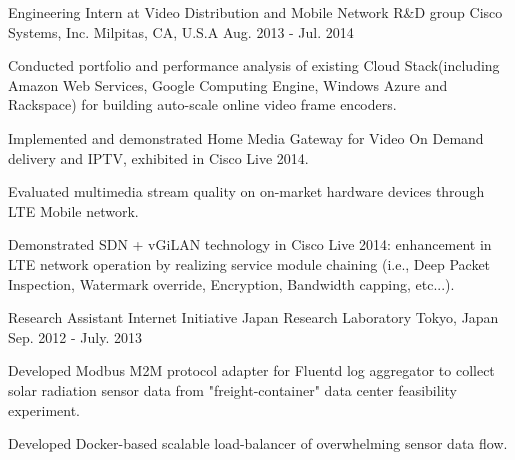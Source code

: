 \begin{cventries}
  \cventry
    {Engineering Intern at Video Distribution and Mobile Network R\&D group} %
    {Cisco Systems, Inc.} %
    {Milpitas, CA, U.S.A} %
    {Aug. 2013 - Jul. 2014} %
    {
      \begin{cvitems} %
        \item{Conducted portfolio and performance analysis of existing Cloud Stack(including Amazon Web Services, Google Computing Engine, Windows Azure and Rackspace) for building auto-scale online video frame encoders.}
        \item{Implemented and demonstrated Home Media Gateway for Video On Demand delivery and IPTV, exhibited in Cisco Live 2014.}
        \item{Evaluated multimedia stream quality on on-market hardware devices through LTE Mobile network.}
        \item{Demonstrated SDN + vGiLAN technology in Cisco Live 2014: enhancement in LTE network operation by realizing service module chaining (i.e., Deep Packet Inspection, Watermark override, Encryption, Bandwidth capping, etc...).}
      \end{cvitems}
    }

  \cventry
    {Research Assistant} %
    {Internet Initiative Japan Research Laboratory} %
    {Tokyo, Japan} %
    {Sep. 2012 - July. 2013} %
    {
      \begin{cvitems} %
        \item {Developed Modbus M2M protocol adapter for Fluentd log aggregator to collect solar radiation sensor data from "freight-container" data center feasibility experiment.}
        \item {Developed Docker-based scalable load-balancer of overwhelming sensor data flow.}
      \end{cvitems}
    }


\end{cventries}
